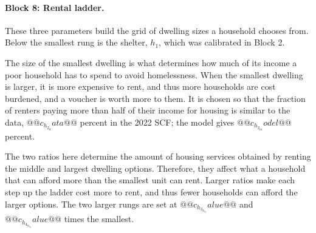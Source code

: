 \documentclass[10pt]{article}
\begin{document}
\paragraph{Block 8: Rental ladder.} These three parameters build the grid of dwelling
sizes a household chooses from. Below the smallest rung is the shelter, $h_1$, which was calibrated in Block 2.
\begin{description}\setlength{\itemsep}{0.25em}\setlength{\parskip}{0em}
\item[$h_2$, the smallest rental size.]   The size of the smallest dwelling is what determines how much of its income a poor household has to spend to avoid homelessness. When the smallest dwelling is larger, it is more expensive to rent, and thus more households are cost burdened, and a voucher is worth more to them. It is chosen so that
the fraction of renters paying more than half of their income for housing is similar to
the data, $@@c_h_2_data@@$ percent in the 2022 SCF; the model gives $@@c_h_2_model@@$
percent.
\item[$h_3/h_2$ and $h_4/h_2$, the spacing of the ladder.]   The two ratios here determine the amount of housing services obtained by renting the middle and largest dwelling options. Therefore, they affect what a household that can afford more than the smallest unit can rent. Larger ratios make each step up the ladder cost more to rent, and thus fewer households can afford the larger options. The two larger
rungs are set at $@@c_h_3_h_2_value@@$ and $@@c_h_4_h_2_value@@$ times the smallest.
\end{description}
\end{document}
